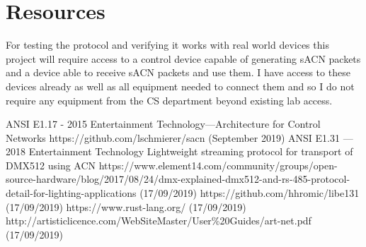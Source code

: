 \documentclass[12pt,a4paper,notitlepage]{report}
\begin{document}
\section*{Resources}
For testing the protocol and verifying it works with real world devices this project will require access to a control device capable of generating sACN packets and a device able to receive sACN packets and use them. I have access to these devices already as well as all equipment needed to connect them and so I do not require any equipment from the CS department beyond existing lab access. 
	
\begin{thebibliography}{9}
	ANSI E1.17 - 2015 Entertainment Technology—Architecture for Control Networks
	https://github.com/lschmierer/sacn (September 2019)
	ANSI E1.31 — 2018 Entertainment Technology Lightweight streaming protocol for transport of DMX512 using ACN
	https://www.element14.com/community/groups/open-source-hardware/blog/2017/08/24/dmx-explained-dmx512-and-rs-485-protocol-detail-for-lighting-applications (17/09/2019)
	https://github.com/hhromic/libe131 (17/09/2019)
	https://www.rust-lang.org/ (17/09/2019)
	http://artisticlicence.com/WebSiteMaster/User\%20Guides/art-net.pdf (17/09/2019)
	
	
\end{thebibliography}
\end{document}
